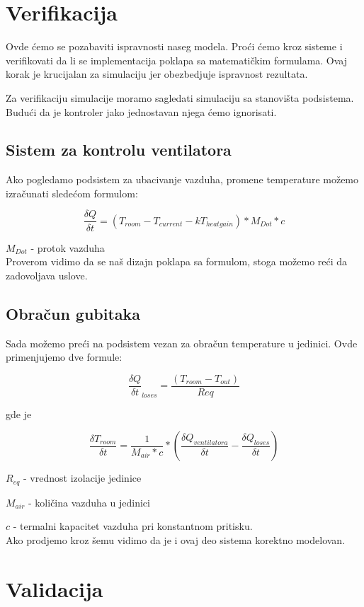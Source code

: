 \documentclass[a4paper,11pt]{book}
\begin{document}
\section{Verifikacija}

Ovde ćemo se pozabaviti ispravnosti naseg modela. Proći ćemo kroz sisteme i verifikovati da li se implementacija poklapa sa matematičkim formulama. Ovaj korak je krucijalan za simulaciju jer obezbedjuje ispravnost rezultata.

Za verifikaciju simulacije moramo sagledati simulaciju sa stanovišta podsistema. Budući da je kontroler jako jednostavan njega ćemo ignorisati.

\subsection{Sistem za kontrolu ventilatora}

Ako pogledamo podsistem za ubacivanje vazduha, promene temperature možemo izračunati sledećom formulom:

\[ \frac{\delta Q}{\delta t} = (T_{room} - T_{current} - kT_{heat gain}) * M_{Dot} * c\]

$M_{Dot}$ - protok vazduha\\

Proverom vidimo da se naš dizajn poklapa sa formulom, stoga možemo reći da zadovoljava uslove.

\subsection{Obračun gubitaka}

Sada možemo preći na podsistem vezan za obračun temperature u jedinici. Ovde primenjujemo dve formule:

\[ \frac{\delta Q}{\delta t}_{loses} = \frac{(T_{room} - T_{out})} {Req}\]

gde je 

\[ \frac{\delta T_{room}}{\delta t} = \frac{1} {M_{air} * c} * (\frac{\delta Q_{ventilatora}}{\delta t} -  \frac{\delta Q_{loses}}{\delta t})\]

$R_{eq}$ - vrednost izolacije jedinice

$M_{air}$ - količina vazduha u jedinici

$c$ - termalni kapacitet vazduha pri konstantnom pritisku.\\

Ako prodjemo kroz šemu vidimo da je i ovaj deo sistema korektno modelovan.
 
\section{Validacija}
\end{document}
